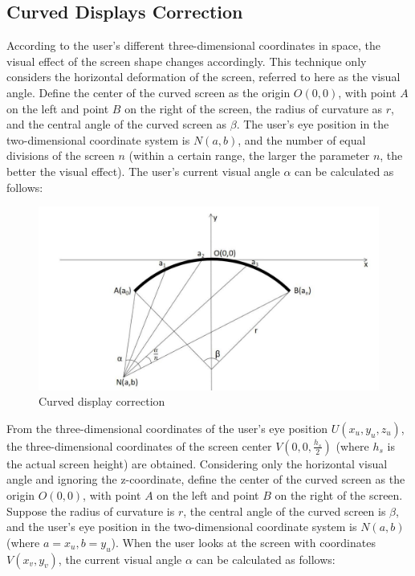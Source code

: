 \subsection{Curved Displays Correction}
According to the user's different three-dimensional coordinates in space, the visual effect of the screen shape changes accordingly. This technique only considers the horizontal deformation of the screen, referred to here as the visual angle. Define the center of the curved screen as the origin \( O(0,0) \), with point \( A \) on the left and point \( B \) on the right of the screen, the radius of curvature as \( r \), and the central angle of the curved screen as \( \beta \). The user's eye position in the two-dimensional coordinate system is \( N(a,b) \), and the number of equal divisions of the screen \( n \) (within a certain range, the larger the parameter \( n \), the better the visual effect). The user's current visual angle \( \alpha \) can be calculated as follows:

\begin{figure}[htb]
    \centering
    \includegraphics[width=1\textwidth]{figures/Implementation/correction.png}
    \caption{Curved display correction}\label{F:test-a}
\end{figure}

From the three-dimensional coordinates of the user's eye position \( U(x_u, y_u, z_u) \), the three-dimensional coordinates of the screen center \( V(0, 0, \frac{h_s}{2}) \) (where \( h_s \) is the actual screen height) are obtained. Considering only the horizontal visual angle and ignoring the z-coordinate, define the center of the curved screen as the origin \( O(0,0) \), with point \( A \) on the left and point \( B \) on the right of the screen. Suppose the radius of curvature is \( r \), the central angle of the curved screen is \( \beta \), and the user's eye position in the two-dimensional coordinate system is \( N(a, b) \) (where \( a = x_u, b = y_u \)). When the user looks at the screen with coordinates \( V(x_v, y_v) \), the current visual angle \( \alpha \) can be calculated as follows:

